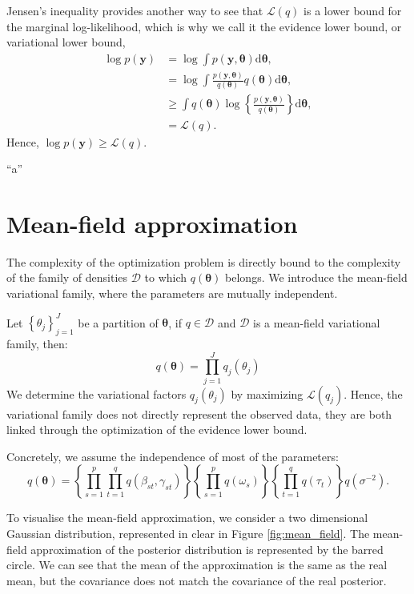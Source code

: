 \documentclass[a4paper, 11pt]{report}
\numberwithin{equation}{section}
\begin{document}
Jensen's inequality provides another way to see that $\mathcal{L}(q)$ is a lower bound for the marginal log-likelihood, which is why we call it the evidence lower bound, or variational lower bound,
\begin{align*}
\log p(\boldsymbol{y}) &= \log \int p(\boldsymbol{y}, \boldsymbol{\theta}) \mathrm{d}\boldsymbol{\theta},\\
&= \log \int \frac{p(\boldsymbol{y}, \boldsymbol{\theta})}{q(\boldsymbol{\theta})}q(\boldsymbol{\theta})\mathrm{d}\boldsymbol{\theta}
,\\
&\geq \int q(\boldsymbol{\theta}) \log \left\lbrace \frac{p(\boldsymbol{y}, \boldsymbol{\theta})}{q(\boldsymbol{\theta})} \right\rbrace \mathrm{d}\boldsymbol{\theta},\\
&= \mathcal{L}(q).
\end{align*}
Hence, $\log p(\boldsymbol{y}) \geq \mathcal{L}(q)$.


``a''
\section{Mean-field approximation}
The complexity of the optimization problem is directly bound to the complexity of the family of densities $\mathcal{D}$ to which $q(\boldsymbol{\theta})$ belongs. We introduce the mean-field variational family, where the parameters are mutually independent.

Let $\left\lbrace \theta_j\right\rbrace_{j=1}^J$ be a partition of $\boldsymbol{\theta}$, if $q \in \mathcal{D}$ and $\mathcal{D}$ is a mean-field variational family, then:
\begin{equation*}
q(\boldsymbol{\theta}) = \prod_{j=1}^J q_j(\theta_j)
\end{equation*}
We determine the variational factors $q_j(\theta_j)$ by maximizing $\mathcal{L}(q_j)$. Hence, the variational family does not directly represent the observed data, they are both linked through the optimization of the evidence lower bound.

Concretely, we assume the independence of most of the parameters:
\begin{equation*}
q(\boldsymbol{\theta}) =\left\lbrace\prod_{s=1}^p \prod_{t=1}^q q(\beta_{st}, \gamma_{st})\right\rbrace \left\lbrace\prod_{s=1}^p  q(\omega_s)\right\rbrace \left\lbrace\prod_{t=1}^q q(\tau_t)\right\rbrace q(\sigma^{-2}).
\end{equation*}

To visualise the mean-field approximation, we consider a two dimensional Gaussian distribution, represented in clear in Figure \ref{fig:mean_field}. The mean-field approximation of the posterior distribution is represented by the barred circle. We can see that the mean of the approximation is the same as the real mean, but the covariance does not match the covariance of the real posterior.
\end{document}
